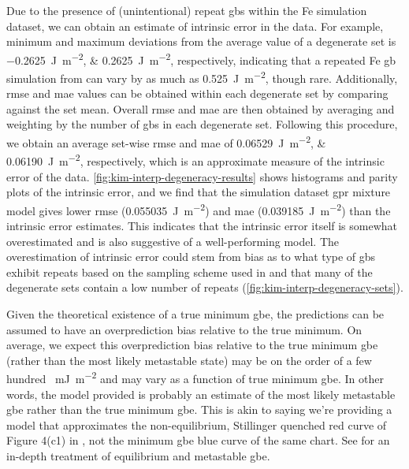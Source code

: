 \documentclass[final,twocolumn,12pt]{elsarticle}
\begin{document}
{%

Due to the presence of (unintentional) repeat \glspl{gb} within the Fe simulation dataset, we can obtain an estimate of intrinsic error in the data. For example, minimum and maximum deviations from the average value of a degenerate set is \SIlist{-0.2625;0.2625}{\joule\per\square\meter}, respectively, indicating that a repeated Fe \gls{gb} simulation from \cite{kimPhasefieldModeling3D2014} can vary by as much as \SI{0.525}{\joule\per\square\meter}, though rare. Additionally, \Gls{rmse} and \gls{mae} values can be obtained within each degenerate set by comparing against the set mean. Overall \gls{rmse} and \gls{mae} are then obtained by averaging and weighting by the number of \glspl{gb} in each degenerate set. Following this procedure, we obtain an average set-wise \gls{rmse} and \gls{mae} of \SIlist{0.06529;0.06190}{\joule\per\square\meter}, respectively, which is an approximate measure of the intrinsic error of the data. \cref{fig:kim-interp-degeneracy-results} shows histograms and parity plots of the intrinsic error, and we find that the simulation dataset \gls{gpr} mixture model gives lower \gls{rmse} (\SI{0.055035}{\joule\per\square\meter}) and \gls{mae} (\SI{0.039185}{\joule\per\square\meter}) than the intrinsic error estimates. This indicates that the intrinsic error itself is somewhat overestimated and is also suggestive of a well-performing model. The overestimation of intrinsic error could stem from bias as to what type of \glspl{gb} exhibit repeats based on the sampling scheme used in \cite{kimPhasefieldModeling3D2014} and that many of the degenerate sets contain a low number of repeats (\cref{fig:kim-interp-degeneracy-sets}).

Given the theoretical existence of a true minimum \gls{gbe}, the predictions can be assumed to have an overprediction bias relative to the true minimum. On average, we expect this overprediction bias relative to the true minimum \gls{gbe} (rather than the most likely metastable state) may be on the order of a few hundred \SI{}{\milli\J\per\square\meter} and may vary as a function of true minimum \gls{gbe}. In other words, the model provided is probably an estimate of the most likely metastable \gls{gbe} rather than the true minimum \gls{gbe}. This is akin to saying we're providing a model that approximates the non-equilibrium, Stillinger quenched red curve of Figure 4(c1) in \cite{hanGrainboundaryMetastabilityIts2016}, not the minimum \gls{gbe} blue curve of the same chart. See \cite{hanGrainboundaryMetastabilityIts2016} for an in-depth treatment of equilibrium and metastable \gls{gbe}.

}
\end{document}
